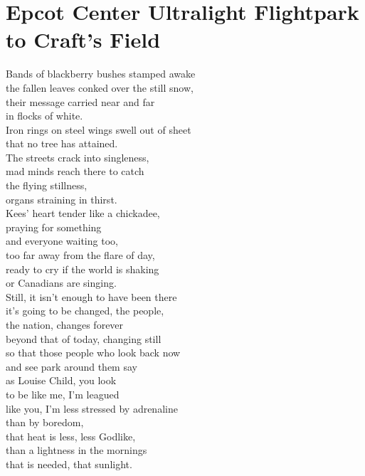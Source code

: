 \documentclass[smalldemyvopaper,11pt,twoside,onecolumn,openright,extrafontsizes]{memoir}
\begin{document}
\chapter{Epcot Center Ultralight Flightpark to Craft's Field}
Bands of blackberry bushes stamped awake
\\the fallen leaves conked over the still snow,
\\their message carried near and far
\\in flocks of white.
\\Iron rings on steel wings swell out of sheet
\\that no tree has attained.
\\The streets crack into singleness,
\\mad minds reach there to catch
\\the flying stillness,
\\organs straining in thirst.
\\Kees' heart tender like a chickadee,
\\praying for something
\\and everyone waiting too,
\\too far away from the flare of day,
\\ready to cry if the world is shaking
\\or Canadians are singing.
\\Still, it isn't enough to have been there
\\it's going to be changed, the people,
\\the nation, changes forever
\\beyond that of today, changing still
\\so that those people who look back now
\\and see park around them say
\\as Louise Child, you look
\\to be like me, I'm leagued
\\like you, I'm less stressed by adrenaline
\\than by boredom,
\\that heat is less, less Godlike,
\\than a lightness in the mornings
\\that is needed, that sunlight.
\end{document}

